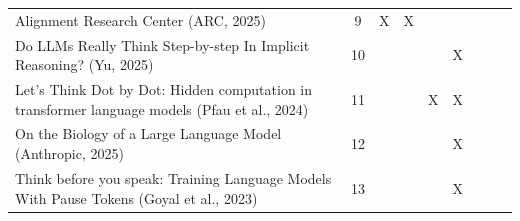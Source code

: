 \begin{landscape}
\begin{longtable}{|p{17cm}|c|c|c|c|c|c|c|c|}
		Alignment Research Center (ARC, 2025)                                                                            & 9           & X                                  & X                                                         &                                                       &                                                            &                                           &                                              &                                                    \\
		Do LLMs Really Think Step-by-step In Implicit Reasoning? (Yu, 2025)                                              & 10          &                                    &                                                           &                                                       & X                                                          &                                           &                                              &                                                    \\
		Let's Think Dot by Dot: Hidden computation in transformer language models (Pfau et al., 2024)                    & 11          &                                    &                                                           & X                                                     & X                                                          &                                           &                                              &                                                    \\
		On the Biology of a Large Language Model (Anthropic, 2025)                                                       & 12          &                                    &                                                           &                                                       & X                                                          &                                           &                                              &                                                    \\
		Think before you speak: Training Language Models With Pause Tokens (Goyal et al., 2023)                          & 13          &                                    &                                                           &                                                       & X                                                          &                                           &                                              &                                                    \\

\end{longtable}
\end{landscape}
